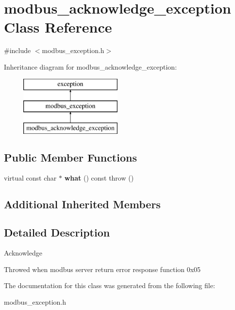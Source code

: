 \hypertarget{classmodbus__acknowledge__exception}{}\section{modbus\+\_\+acknowledge\+\_\+exception Class Reference}
\label{classmodbus__acknowledge__exception}


{\ttfamily \#include $<$modbus\+\_\+exception.\+h$>$}

Inheritance diagram for modbus\+\_\+acknowledge\+\_\+exception\+:\begin{figure}[H]
\begin{center}
\leavevmode
\includegraphics[height=3.000000cm]{classmodbus__acknowledge__exception}
\end{center}
\end{figure}
\subsection*{Public Member Functions}
\begin{DoxyCompactItemize}
\item 
\mbox{\label{classmodbus__acknowledge__exception_a6542c8a1a42041ac2498c444ef42b62d}} 
virtual const char $\ast$ {\bfseries what} () const  throw ()
\end{DoxyCompactItemize}
\subsection*{Additional Inherited Members}


\subsection{Detailed Description}
Acknowledge

Throwed when modbus server return error response function 0x05 

The documentation for this class was generated from the following file\+:\begin{DoxyCompactItemize}
\item 
modbus\+\_\+exception.\+h\end{DoxyCompactItemize}
